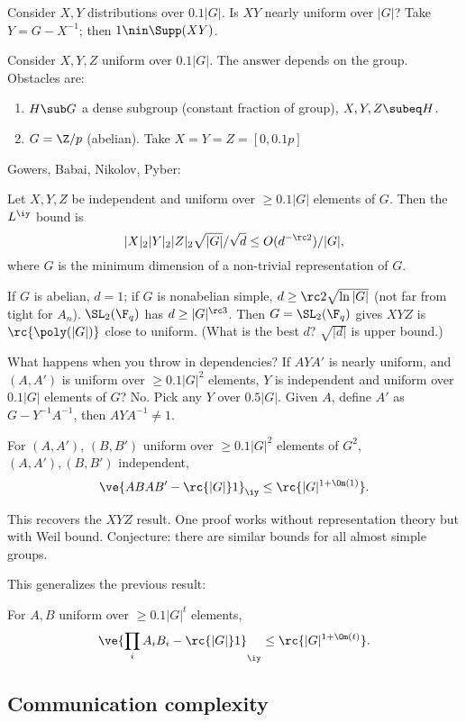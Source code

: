 Consider $X,Y$ distributions over $0.1|G|$. Is $XY$ nearly uniform over $|G|$? Take $Y=G-X^{-1}$; then $1\nin \Supp(XY)$.

Consider $X,Y,Z$ uniform over $0.1|G|$. The answer depends on the group. Obstacles are:
\begin{enumerate}
\item
$H\sub G$ a dense subgroup (constant fraction of group), $X,Y,Z\subeq H$.
\item 
$G=\Z/p$ (abelian). Take $X=Y=Z=[0,0.1p]$
\end{enumerate}

Gowers, Babai, Nikolov, Pyber:
\begin{thm}
Let $X,Y,Z$ be independent and uniform over $\ge 0.1|G|$ elements of $G$. Then the $L^{\iy}$ bound is
\[
|X|_2|Y|_2|Z|_2\sqrt{|G|}/\sqrt d\le O(d^{-\rc 2})/|G|,
\]
where $G$ is the minimum dimension of a non-trivial representation of $G$.
\end{thm}

If $G$ is abelian, $d=1$; if $G$ is nonabelian simple, $d\ge \rc2 \sqrt{\ln |G|}$ (not far from tight for $A_n$). $\SL_2(\F_q)$ has $d\ge |G|^{\rc 3}$. Then $G=\SL_2(\F_q)$ gives $XYZ$ is $\rc{\poly(|G|)}$ close to uniform. (What is the best $d$? $\sqrt{|d|}$ is upper bound.) %

What happens when you throw in dependencies? If $AYA'$ is nearly uniform, and $(A,A')$ is uniform over $\ge 0.1|G|^2$ elements, $Y$ is independent and uniform over $0.1|G|$ elements of $G$? No. Pick any $Y$ over $0.5|G|$. Given $A$, define $A'$ as $G-Y^{-1}A^{-1}$, then $AYA^{-1}\ne 1$.

\begin{thm}
For $(A,A')$, $(B,B')$ uniform over $\ge 0.1|G|^2$ elements of $G^2$, $(A,A'),(B,B')$ independent, 
\[
\ve{ABAB'-\rc{|G|}1}_{\iy}\le \rc{|G|^{1+\Om(1)}}.
\]
\end{thm}
This recovers the $XYZ$ result.
One proof works without representation theory but with Weil bound.
Conjecture: there are similar bounds for all almost simple groups.

This generalizes the previous result:
\begin{thm}
For $A,B$ uniform over $\ge 0.1|G|^t$ elements,
\[
\ve{\prod_i A_iB_i-\rc{|G|}1}_{\iy}\le \rc{|G|^{1+\Om(t)}}.
\]
\end{thm}

\subsection{Communication complexity}

